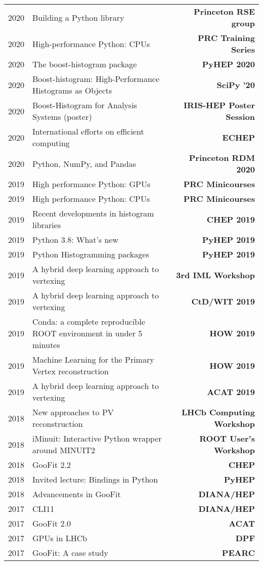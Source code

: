 \documentclass[10pt,letterpaper]{moderncv}
\begin{document}
\begin{tabularx}{\textwidth}{p{.33in}X>{\bfseries}r}
    2020 & Building a Python library & Princeton RSE group \\
    2020 & High-performance Python: CPUs & PRC Training Series \\
    2020 & The boost-histogram package & PyHEP 2020 \\
    2020 & Boost-histogram: High-Performance Histograms as Objects & SciPy '20 \\
    2020 & Boost-Histogram for Analysis Systems (poster) & IRIS-HEP Poster Session \\
    2020 & International efforts on efficient computing & ECHEP \\
    2020 & Python, NumPy, and Pandas & Princeton RDM 2020 \\
    2019 & High performance Python: GPUs & PRC Minicourses \\
    2019 & High performance Python: CPUs & PRC Minicourses \\
    2019 & Recent developments in histogram libraries  & CHEP 2019 \\
    2019 & Python 3.8: What's new & PyHEP 2019 \\
    2019 & Python Histogramming packages & PyHEP 2019\\
    2019 & A hybrid deep learning approach to vertexing & 3rd IML Workshop \\
    2019 & A hybrid deep learning approach to vertexing & CtD/WIT 2019 \\
    2019 & Conda: a complete reproducible ROOT environment in under 5 minutes & HOW 2019 \\
    2019 & Machine Learning for the Primary Vertex reconstruction & HOW 2019 \\
    2019 & A hybrid deep learning approach to vertexing & ACAT 2019 \\ %
	2018 & New approaches to PV reconstruction & LHCb Computing Workshop \\ %
	2018 & iMinuit: Interactive Python wrapper around MINUIT2 & ROOT User's Workshop \\  %
	2018 & GooFit 2.2 & CHEP \\ %
	2018 & Invited lecture: Bindings in Python & PyHEP  \\
    2018 & Advancements in GooFit & DIANA/HEP \\
	2017 & CLI11 & DIANA/HEP \\
	2017 & GooFit 2.0 & ACAT \\
	2017 & GPUs in LHCb & DPF \\ %
	2017 & GooFit: A case study & PEARC \\
\end{tabularx}
\end{document}
